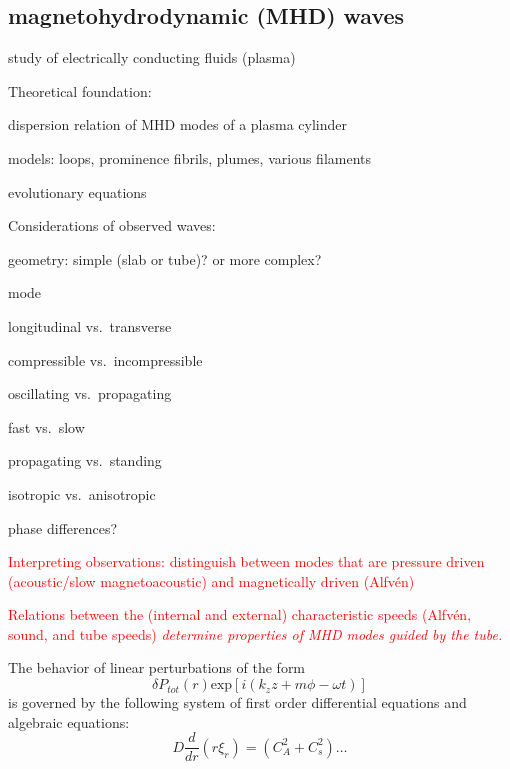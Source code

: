 \documentclass[12pt]{article}
\begin{document}
\subsection*{magnetohydrodynamic (MHD) waves}
\begin{itemize*}
    \item study of electrically conducting fluids (plasma)
    \item Theoretical foundation:
        \begin{itemize*}
            \item dispersion relation of MHD modes of a plasma cylinder
            \item models: loops, prominence fibrils, plumes, various filaments
            \item evolutionary equations
        \end{itemize*}
    \item Considerations of observed waves:
        \begin{itemize*}
            \item geometry: simple (slab or tube)? or more complex?
            \item mode
                \begin{itemize*}
                    \item longitudinal vs.\ transverse
                    \item compressible vs.\ incompressible
                    \item oscillating vs.\ propagating
                    \item fast vs.\ slow
                    \item propagating vs.\ standing
                    \item isotropic vs.\ anisotropic
                    \item phase differences?
                \end{itemize*}
        \end{itemize*}
    \item \textcolor{red}{Interpreting observations: distinguish between modes
        that are pressure driven (acoustic/slow magnetoacoustic)
        and magnetically driven (Alfv\'en)}
    \item \textcolor{red}{Relations between the (internal and external)
        characteristic speeds (Alfv\'en, sound, and tube speeds)
        \emph{determine properties of MHD modes guided by the tube.}}
    \item The behavior of linear perturbations of the form
        $$ \delta P_{tot}(r)\textrm{exp}\left[i(k_zz+m\phi-\omega t)\right]  $$
        is governed by  the following system of first order differential
        equations and algebraic equations:
        $$ D\frac{d}{dr}(r\xi_r) = (C_A^2+C_s^2)\ldots  $$


\end{itemize*}
\end{document}
